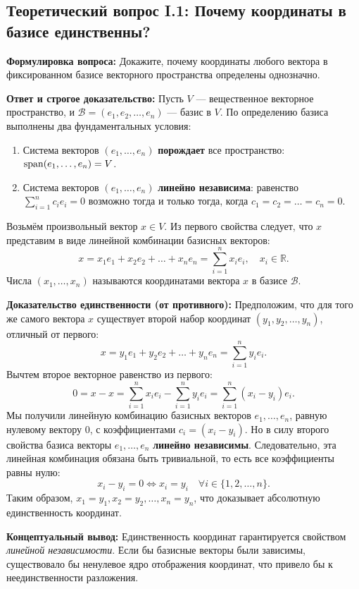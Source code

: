 
\subsection{Теоретический вопрос I.1: Почему координаты в базисе единственны?}
\textbf{Формулировка вопроса:} Докажите, почему координаты любого вектора в фиксированном базисе векторного пространства
определены однозначно.

\textbf{Ответ и строгое доказательство:}
Пусть $V$ — вещественное векторное пространство, и $\mathcal{B} = (e_1, e_2, \dots, e_n)$ — базис в $V$.
По определению базиса выполнены два фундаментальных условия:
\begin{enumerate}
    \item Система векторов $(e_1, \dots, e_n)$ \textbf{порождает} все пространство: $\operatorname{span}(e_1, \dots, e_n) = V$.
    \item Система векторов $(e_1, \dots, e_n)$ \textbf{линейно независима}: равенство $\sum_{i=1}^n c_i e_i = 0$
    возможно тогда и только тогда, когда $c_1 = c_2 = \dots = c_n = 0$.
\end{enumerate}

Возьмём произвольный вектор $x \in V$.
Из первого свойства следует, что $x$ представим в виде линейной комбинации базисных векторов:
\[ x = x_1 e_1 + x_2 e_2 + \dots + x_n e_n = \sum_{i=1}^n x_i e_i, \quad x_i \in \mathbb{R}. \]
Числа $(x_1, \dots, x_n)$ называются координатами вектора $x$ в базисе $\mathcal{B}$.

\textbf{Доказательство единственности (от противного):} Предположим, что для того же самого вектора $x$ существует
второй набор координат $(y_1, y_2, \dots, y_n)$, отличный от первого:
\[ x = y_1 e_1 + y_2 e_2 + \dots + y_n e_n = \sum_{i=1}^n y_i e_i. \]
Вычтем второе векторное равенство из первого:
\[ 0 = x - x = \sum_{i=1}^n x_i e_i - \sum_{i=1}^n y_i e_i = \sum_{i=1}^n (x_i - y_i) e_i. \]
Мы получили линейную комбинацию базисных векторов $e_1, \dots, e_n$, равную нулевому вектору $0$, с коэффициентами $c_i
= (x_i - y_i)$.
Но в силу второго свойства базиса векторы $e_1, \dots, e_n$ \textbf{линейно независимы}.
Следовательно, эта линейная комбинация обязана быть тривиальной, то есть все коэффициенты равны нулю:
\[ x_i - y_i = 0 \iff x_i = y_i \quad \forall i \in \{1, 2, \dots, n\}. \]
Таким образом, $x_1 = y_1, x_2 = y_2, \dots, x_n = y_n$, что доказывает абсолютную единственность координат.

\textbf{Концептуальный вывод:} Единственность координат гарантируется свойством \emph{линейной независимости}.
Если бы базисные векторы были зависимы, существовало бы ненулевое ядро отображения координат, что привело бы к
неединственности разложения.

